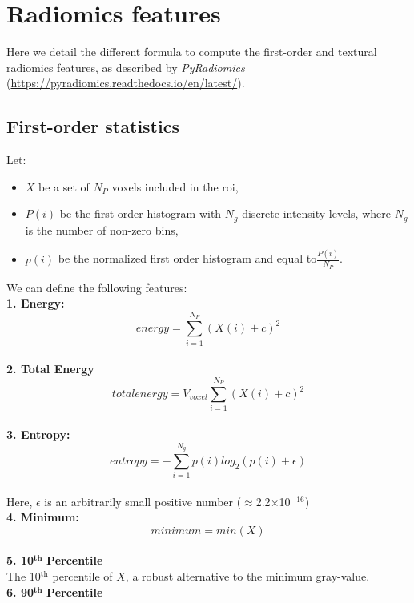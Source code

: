 \chapter{Radiomics features}\label{appendix---radiomicsFeatures}

Here we detail the different formula to compute the first-order and textural radiomics features, as described by \textit{PyRadiomics} (\url{https://pyradiomics.readthedocs.io/en/latest/}).

\newcommand*\mean[1]{\overline{#1}}

\section{First-order statistics}

Let:
\begin{itemize}
\item $X$ be a set of $N_{P}$ voxels included in the \ac{roi},
\item 
 $P\left(i\right)$ be the first order histogram with $N_{g}$ discrete intensity levels, where $N_{g}$ is the number of non-zero bins,
\item $p\left(i\right)$ be the normalized first order histogram and equal to$\frac{P\left(i\right)}{N_{P}}$.
\end{itemize}
We can define the following features: \\
\textbf{1. Energy:}\\
\[\textit{energy}=\sum _{i=1}^{N_{P}}\left(X\left(i\right)+c\right)^{2}\]\\
\textbf{2. Total Energy}\\
\[\textit{totalenergy}=V_{\textit{voxel}}\sum _{i=1}^{N_{P}}\left(X\left(i\right)+c\right)^{2}\] \\
\textbf{3. Entropy:}\\
\[\textit{entropy}=-\sum _{i=1}^{N_{g}}p\left(i\right)log_{2}\left(p\left(i\right)+\epsilon \right)\] \\
Here, $\epsilon $ is an arbitrarily small positive number (${\approx}$2.2${\times}$10$^{-16}$) \\
\textbf{4. Minimum:}\\
\[\textit{minimum}=min \left(X\right)\]\\
\textbf{5. 10}$^{\mathbf{th}}$ \textbf{Percentile}\\
The 10$^{\mathrm{th}}$ percentile of $X$, a robust alternative to the minimum gray-value.\\
\textbf{6. 90}$^{\mathbf{th}}$ \textbf{Percentile}\\
